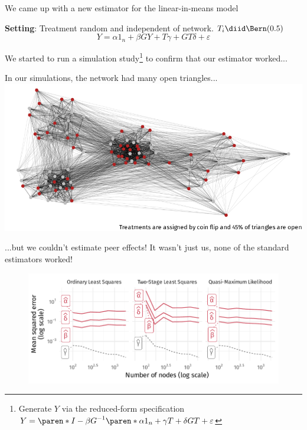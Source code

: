\documentclass[aspectratio=169]{beamer}
\theoremstyle{remark}
\begin{document}
\begin{frame}{We came up with a new estimator for the linear-in-means model}
    
    \textbf{Setting}: Treatment random and independent of network. $T_i \diid \Bern(0.5)$ \\
    
    \Large
    \begin{equation*}
        Y = \alpha 1_n + \beta G Y + T \gamma + G T \delta + \varepsilon
    \end{equation*}
    
    \normalsize
    We started to run a simulation study\footnote{Generate $Y$ via the reduced-form specification $Y = \paren*{I - \beta G}^{-1} \paren*{\alpha 1_n + \gamma T + \delta G T + \varepsilon}$} to confirm that our estimator worked...
    
\end{frame}

\begin{frame}{In our simulations, the network had many open triangles...}
    \centering
    \includegraphics{./figures/simulations/jobtalk-backbone.pdf}
\end{frame}

\begin{frame}{...but we couldn't estimate peer effects!}
    It wasn't just us, none of the standard estimators worked!
    \begin{figure}
        \centering
        \includegraphics[width=\textwidth]{./figures/simulations/jobtalk-mse.pdf}
    \end{figure}
\end{frame}
\end{document}
